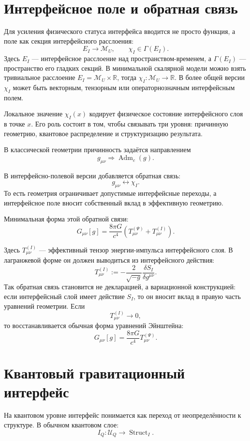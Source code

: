 \documentclass[12pt,a4paper]{article}
\DeclareMathOperator{\Adm}{Adm}
\DeclareMathOperator{\Struct}{Struct}
\newcommand{\M}{\mathcal M_U}
\newcommand{\Unc}{\mathcal U}
\begin{document}
\section{Интерфейсное поле и обратная связь}

Для усиления физического статуса интерфейса вводится не просто функция, а поле как секция интерфейсного расслоения:
\[
\boxed{
E_I\longrightarrow \M,
\qquad
\chi_I\in\Gamma(E_I).
}
\]
Здесь $E_I$ --- интерфейсное расслоение над пространством-временем, а $\Gamma(E_I)$ --- пространство его гладких секций. В минимальной скалярной модели можно взять тривиальное расслоение $E_I=\M\times\mathbb R$, тогда $\chi_I:\M\to\mathbb R$. В более общей версии $\chi_I$ может быть векторным, тензорным или операторнозначным интерфейсным полем.

Локальное значение $\chi_I(x)$ кодирует физическое состояние интерфейсного слоя в точке $x$. Его роль состоит в том, чтобы связывать три уровня: причинную геометрию, квантовое распределение и структуризацию результата.

В классической геометрии причинность задаётся направлением
\[
g_{\mu\nu}\Rightarrow \Adm_c(g).
\]

В интерфейсно-полевой версии добавляется обратная связь:
\[
\boxed{
g_{\mu\nu}\leftrightarrow\chi_I.
}
\]
То есть геометрия ограничивает допустимые интерфейсные переходы, а интерфейсное поле вносит собственный вклад в эффективную геометрию.

Минимальная форма этой обратной связи:
\[
\boxed{
G_{\mu\nu}[g]
=
\frac{8\pi G}{c^4}
\left(
T_{\mu\nu}^{(\Psi)}+T_{\mu\nu}^{(I)}
\right).
}
\]

Здесь $T_{\mu\nu}^{(I)}$ --- эффективный тензор энергии-импульса интерфейсного слоя. В лагранжевой форме он должен выводиться из интерфейсного действия:
\[
\boxed{
T_{\mu\nu}^{(I)}
:=
-\frac{2}{\sqrt{-g}}
\frac{\delta S_I}{\delta g^{\mu\nu}}.
}
\]
Так обратная связь становится не декларацией, а вариационной конструкцией: если интерфейсный слой имеет действие $S_I$, то он вносит вклад в правую часть уравнений геометрии. Если
\[
T_{\mu\nu}^{(I)}\to 0,
\]
то восстанавливается обычная форма уравнений Эйнштейна:
\[
G_{\mu\nu}[g]
=
\frac{8\pi G}{c^4}T_{\mu\nu}^{(\Psi)}.
\]

\section{Квантовый гравитационный интерфейс}

На квантовом уровне интерфейс понимается как переход от неопределённости к структуре. В обычном квантовом слое:
\[
I_Q:\Unc_Q\to\Struct_I.
\]
\end{document}
